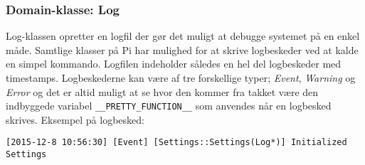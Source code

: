 \subsubsection{Domain-klasse: Log} \label{sec:log_klasse}

Log-klassen opretter en logfil der gør det muligt at debugge systemet på en enkel måde. Samtlige klasser på Pi har mulighed for at skrive logbeskeder ved at kalde en simpel kommando. Logfilen indeholder således en hel del logbeskeder med timestamps. Logbeskederne kan være af tre forskellige typer; \textit{Event}, \textit{Warning} og \textit{Error} og det er altid muligt at se hvor den kommer fra takket være den indbyggede variabel \texttt{\_\_PRETTY\_FUNCTION\_\_} \cite{lib:prettyf} som anvendes når en logbesked skrives. Eksempel på logbesked:

\texttt{[2015-12-8 10:56:30] [Event] [Settings::Settings(Log*)] Initialized Settings}\\
